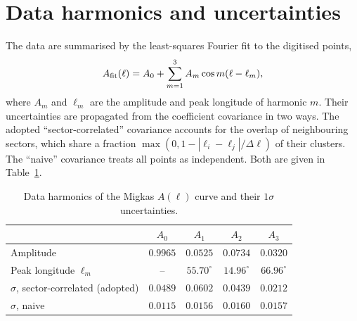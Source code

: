 \documentclass[10pt]{article}
\begin{document}
\section{Data harmonics and uncertainties}
The data are summarised by the least-squares Fourier fit to the digitised points,
\begin{equation}
A_{\rm fit}(\ell)=A_0+\sum_{m=1}^{3}A_m\cos m(\ell-\ell_m),
\label{eq:datafit}
\end{equation}
where $A_m$ and $\ell_m$ are the amplitude and peak longitude of harmonic $m$. Their uncertainties are propagated from the coefficient covariance in two ways. The adopted ``sector-correlated'' covariance accounts for the overlap of neighbouring sectors, which share a fraction $\max(0,1-|\ell_i-\ell_j|/\Delta\ell)$ of their clusters. The ``naive'' covariance treats all points as independent. Both are given in Table~\ref{tab:data}.

\begin{table}[!htb]\centering\small
\caption{Data harmonics of the Migkas $A(\ell)$ curve and their $1\sigma$ uncertainties.}\label{tab:data}
\begin{tabular}{lcccc}\toprule
 & $A_0$ & $A_1$ & $A_2$ & $A_3$\\\midrule
Amplitude & $0.9965$ & $0.0525$ & $0.0734$ & $0.0320$\\
Peak longitude $\ell_m$ & -- & $55.70^\circ$ & $14.96^\circ$ & $66.96^\circ$\\
$\sigma$, sector-correlated (adopted) & $0.0489$ & $0.0602$ & $0.0439$ & $0.0212$\\
$\sigma$, naive & $0.0115$ & $0.0156$ & $0.0160$ & $0.0157$\\\bottomrule
\end{tabular}
\end{table}
\end{document}
